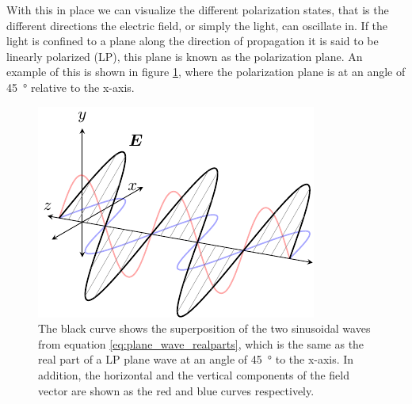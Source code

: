 With this in place we can visualize the different polarization states, that is the different directions the electric field, or simply the light, can oscillate in. If the light is confined to a plane along the direction of propagation it is said to be linearly polarized (LP), this plane is known as the polarization plane. An example of this is shown in figure \ref{fig:E_planewave}, where the polarization plane is at an angle of \SI{45}{\degree} relative to the x-axis. 

\begin{figure}[h]
    \centering
    \includegraphics[scale=1.1]{images/theory/tikz_linear_pol.pdf}
    \caption{The black curve shows the superposition of the two sinusoidal waves from equation \ref{eq:plane_wave_realparts}, which is the same as the real part of a LP plane wave at an angle of \SI{45}{\degree} to the x-axis. In addition, the horizontal and the vertical components of the field vector are shown as the red and blue curves respectively.}
    \label{fig:E_planewave}
\end{figure}

